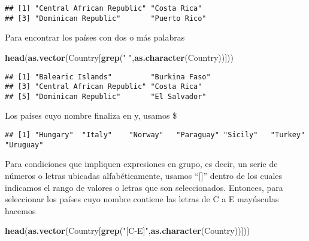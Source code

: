 \documentclass[]{article}
\newenvironment{Shaded}{\begin{snugshade}}{\end{snugshade}}
\newcommand{\KeywordTok}[1]{\textcolor[rgb]{0.13,0.29,0.53}{\textbf{#1}}}
\newcommand{\StringTok}[1]{\textcolor[rgb]{0.31,0.60,0.02}{#1}}
\newcommand{\NormalTok}[1]{#1}
\begin{document}
\begin{verbatim}
## [1] "Central African Republic" "Costa Rica"              
## [3] "Dominican Republic"       "Puerto Rico"
\end{verbatim}

Para encontrar los países con dos o más palabras

\begin{Shaded}
\begin{Highlighting}[]
\KeywordTok{head}\NormalTok{(}\KeywordTok{as.vector}\NormalTok{(Country[}\KeywordTok{grep}\NormalTok{(}\StringTok{" "}\NormalTok{,}\KeywordTok{as.character}\NormalTok{(Country))]))}
\end{Highlighting}
\end{Shaded}

\begin{verbatim}
## [1] "Balearic Islands"         "Burkina Faso"            
## [3] "Central African Republic" "Costa Rica"              
## [5] "Dominican Republic"       "El Salvador"
\end{verbatim}

Los países cuyo nombre finaliza en y, usamos \$

\begin{Shaded}
\end{Shaded}

\begin{verbatim}
## [1] "Hungary"  "Italy"    "Norway"   "Paraguay" "Sicily"   "Turkey"   "Uruguay"
\end{verbatim}

Para condiciones que impliquen expresiones en grupo, es decir, un serie
de números o letras ubicadas alfabéticamente, usamos ``{[}{]}'' dentro
de los cuales indicamos el rango de valores o letras que son
seleccionados. Entonces, para seleccionar los países cuyo nombre
contiene las letras de C a E mayúsculas hacemos

\begin{Shaded}
\begin{Highlighting}[]
\KeywordTok{head}\NormalTok{(}\KeywordTok{as.vector}\NormalTok{(Country[}\KeywordTok{grep}\NormalTok{(}\StringTok{"[C-E]"}\NormalTok{,}\KeywordTok{as.character}\NormalTok{(Country))]))}
\end{Highlighting}
\end{Shaded}
\end{document}
